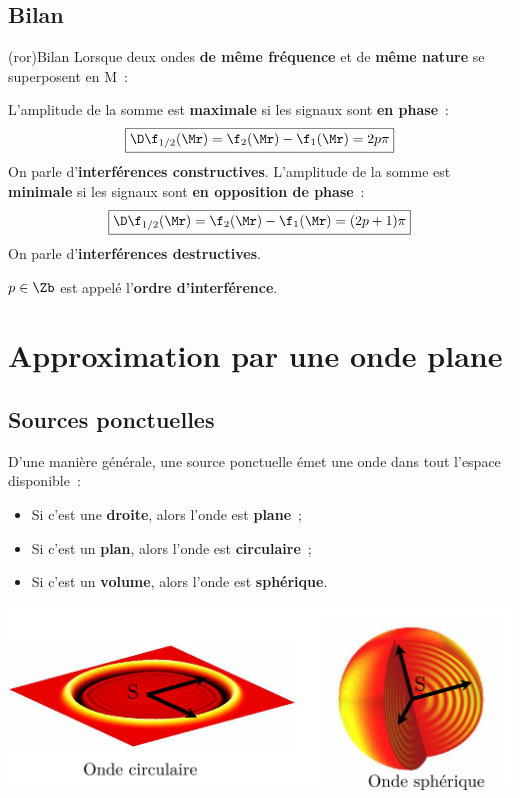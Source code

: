 \documentclass[../../main/main.tex]{subfiles}
\begin{document}
\subsection{Bilan}

\begin{tcb}[breakable](ror){Bilan}
	Lorsque deux ondes \textbf{de même fréquence} et de \textbf{même nature} se
	superposent en M~:
	\begin{isd}
		L'amplitude de la somme est \textbf{maximale} si les signaux sont
		\textbf{en phase}~:
		\[\boxed{\D\f_{1/2}(\Mr) = \f_2(\Mr)-\f_1(\Mr) = 2p\pi}\]
		On parle d'\textbf{interférences constructives}.
		\tcblower
		L'amplitude de la somme est \textbf{minimale} si les signaux sont
		\textbf{en opposition de phase}~:
		\[\boxed{\D\f_{1/2}(\Mr) = \f_2(\Mr)-\f_1(\Mr) = (2p+1)\pi}\]
		On parle d'\textbf{interférences destructives}.
	\end{isd}
	\centering$p\in\Zb$ est appelé l'\textbf{ordre d'interférence}.
\end{tcb}

\section{Approximation par une onde plane}
\subsection{Sources ponctuelles}
\begin{minipage}{0.55\linewidth}
	D'une manière générale, une source ponctuelle émet une onde dans tout l'espace
	disponible~:
	\begin{itemize}
		\item Si c'est une \textbf{droite}, alors l'onde est \textbf{plane}~;
		\item Si c'est un \textbf{plan}, alors l'onde est \textbf{circulaire}~;
		\item Si c'est un \textbf{volume}, alors l'onde est \textbf{sphérique}.
	\end{itemize}
\end{minipage}
\hfill
\begin{minipage}{0.35\linewidth}
	\begin{center}
		\includegraphics[width=\linewidth]{ondes_c_s}
	\end{center}
\end{minipage}\bigbreak
\end{document}
